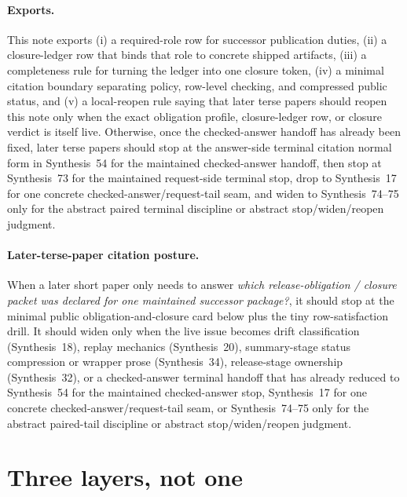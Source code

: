 \documentclass[11pt]{article}
\begin{document}
\paragraph{Exports.}
This note exports (i) a required-role row for successor publication duties, (ii) a closure-ledger row that binds that role to concrete shipped artifacts, (iii) a completeness rule for turning the ledger into one closure token, (iv) a minimal citation boundary separating policy, row-level checking, and compressed public status, and (v) a local-reopen rule saying that later terse papers should reopen this note only when the exact obligation profile, closure-ledger row, or closure verdict is itself live. Otherwise, once the checked-answer handoff has already been fixed, later terse papers should stop at the answer-side terminal citation normal form in Synthesis~54 for the maintained checked-answer handoff, then stop at Synthesis~73 for the maintained request-side terminal stop, drop to Synthesis~17 for one concrete checked-answer/request-tail seam, and widen to Synthesis~74--75 only for the abstract paired terminal discipline or abstract stop/widen/reopen judgment.\cite{series:challengeanswerreviewmenus,series:pairedterminalcitationdiscipline,series:pairedterminalcutoverrules,series:workedexample}

\paragraph{Later-terse-paper citation posture.}
When a later short paper only needs to answer \emph{which release-obligation / closure packet was declared for one maintained successor package?}, it should stop at the minimal public obligation-and-closure card below plus the tiny row-satisfaction drill. It should widen only when the live issue becomes drift classification (Synthesis~18), replay mechanics (Synthesis~20), summary-stage status compression or wrapper prose (Synthesis~34), release-stage ownership (Synthesis~32), or a checked-answer terminal handoff that has already reduced to Synthesis~54 for the maintained checked-answer stop, Synthesis~17 for one concrete checked-answer/request-tail seam, or Synthesis~74--75 only for the abstract paired-tail discipline or abstract stop/widen/reopen judgment.\cite{series:planstateequiv,series:auditorreplay,series:statusenvelopes,series:releasespine,series:challengeanswerreviewmenus,series:pairedterminalcitationdiscipline,series:pairedterminalcutoverrules,series:workedexample}

\section{Three layers, not one}
\end{document}
